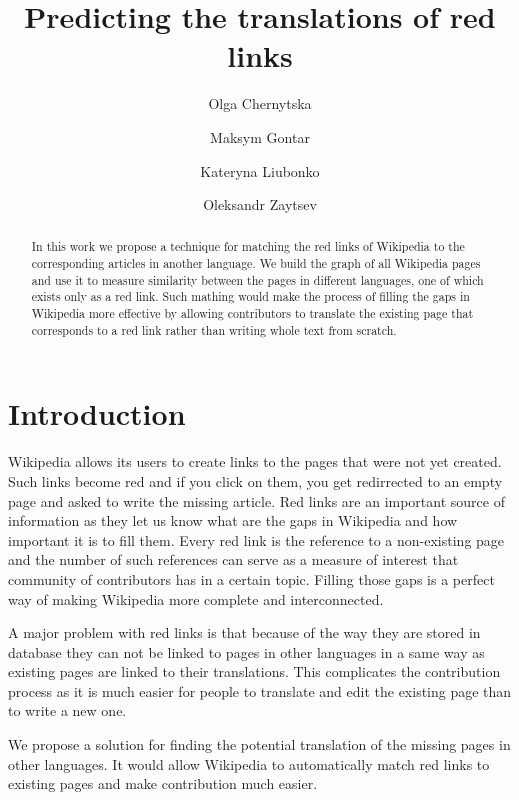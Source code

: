 \documentclass[11pt,a4paper]{article}
\begin{document}
\title{Predicting the translations of red links}
\date{}

\author[ ]{Olga Chernytska}
\author[ ]{Maksym Gontar}
\author[ ]{Kateryna Liubonko}
\author[ ]{Oleksandr Zaytsev}


\maketitle

\begin{abstract}
In this work we propose a technique for matching the red links of Wikipedia to the corresponding articles in another language. We build the graph of all Wikipedia pages and use it to measure similarity between the pages in different languages, one of which exists only as a red link. Such mathing would make the process of filling the gaps in Wikipedia more effective by allowing contributors to translate the existing page that corresponds to a red link rather than writing whole text from scratch.
\end{abstract}

\section{Introduction}

Wikipedia allows its users to create links to the pages that were not yet created. Such links become red and if you click on them, you get redirrected to an empty page and asked to write the missing article. Red links are an important source of information as they let us know what are the gaps in Wikipedia and how important it is to fill them. Every red link is the reference to a non-existing page and the number of such references can serve as a measure of interest that community of contributors has in a certain topic. Filling those gaps is a perfect way of making Wikipedia more complete and interconnected.

A major problem with red links is that because of the way they are stored in database they can not be linked to pages in other languages in a same way as existing pages are linked to their translations. This complicates the contribution process as it is much easier for people to translate and edit the existing page than to write a new one.

We propose a solution for finding the potential translation of the missing pages in other languages. It would allow Wikipedia to automatically match red links to existing pages and make contribution much easier.
\end{document}
